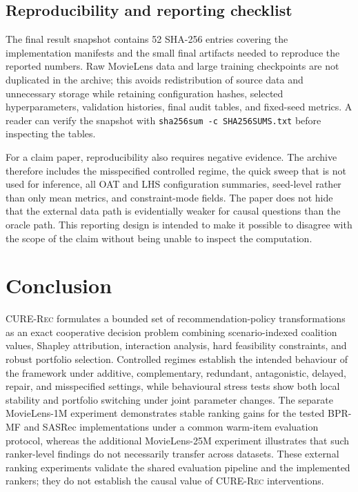 \documentclass[pdflatex,sn-mathphys-num]{sn-jnl}
\theoremstyle{thmstyleone}
\theoremstyle{thmstyletwo}
\theoremstyle{thmstylethree}
\newcommand{\CURE}{\textsc{CURE-Rec}}
\begin{document}
\subsection{Reproducibility and reporting checklist}

The final result snapshot contains 52 SHA-256 entries covering the implementation manifests and the small final artifacts needed to reproduce the reported numbers. Raw MovieLens data and large training checkpoints are not duplicated in the archive; this avoids redistribution of source data and unnecessary storage while retaining configuration hashes, selected hyperparameters, validation histories, final audit tables, and fixed-seed metrics. A reader can verify the snapshot with \texttt{sha256sum -c SHA256SUMS.txt} before inspecting the tables.

For a claim paper, reproducibility also requires negative evidence. The archive therefore includes the misspecified controlled regime, the quick sweep that is not used for inference, all OAT and LHS configuration summaries, seed-level rather than only mean metrics, and constraint-mode fields. The paper does not hide that the external data path is evidentially weaker for causal questions than the oracle path. This reporting design is intended to make it possible to disagree with the scope of the claim without being unable to inspect the computation.

\section{Conclusion}\label{sec:conclusion}

\CURE{} formulates a bounded set of recommendation-policy transformations as an exact cooperative decision problem combining scenario-indexed coalition values, Shapley attribution, interaction analysis, hard feasibility constraints, and robust portfolio selection. Controlled regimes establish the intended behaviour of the framework under additive, complementary, redundant, antagonistic, delayed, repair, and misspecified settings, while behavioural stress tests show both local stability and portfolio switching under joint parameter changes. The separate MovieLens-1M experiment demonstrates stable ranking gains for the tested BPR-MF and SASRec implementations under a common warm-item evaluation protocol, whereas the additional MovieLens-25M experiment illustrates that such ranker-level findings do not necessarily transfer across datasets. These external ranking experiments validate the shared evaluation pipeline and the implemented rankers; they do not establish the causal value of \CURE{} interventions.
\end{document}
